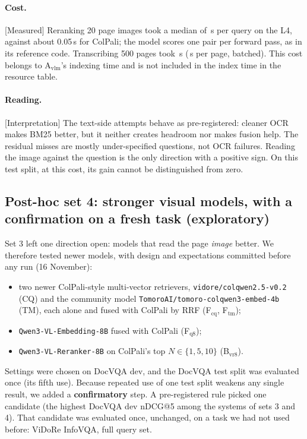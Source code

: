 \documentclass[11pt,a4paper]{article}
\newcommand{\lbl}[2]{\textsf{\scriptsize\textcolor{#1}{[#2]}}}
\newcommand{\Int}{\lbl{tagI}{Interpretation}}
\newcommand{\Mea}{\lbl{tagM}{Measured}}
\begin{document}
\paragraph{Cost.} \Mea{} Reranking 20 page images took a median of \vrLatTwenty{}\,s per query on the L4, against about 0.05\,s for ColPali; the model scores one pair per forward pass, as in its reference code. Transcribing 500 pages took \ocrS{}\,s (\ocrPerPage{}\,s per page, batched). This cost belongs to A$_\text{vlm}$'s indexing time and is not included in the index time in the resource table.

\paragraph{Reading.} \Int{} The text-side attempts behave as pre-registered: cleaner OCR makes BM25 better, but it neither creates headroom nor makes fusion help. The residual misses are mostly under-specified questions, not OCR failures. Reading the image against the question is the only direction with a positive sign. On this test split, at this cost, its gain cannot be distinguished from zero.

\subsection{Post-hoc set 4: stronger visual models, with a confirmation on a fresh task (exploratory)}
\label{sec:posthoc4}
Set 3 left one direction open: models that read the page \emph{image} better. We therefore tested newer models, with design and expectations committed before any run (16 November):
\begin{itemize}
  \item two newer ColPali-style multi-vector retrievers, \texttt{vidore/colqwen2.5-v0.2} (CQ) and the community model \texttt{TomoroAI/tomoro-colqwen3-embed-4b} (TM), each alone and fused with ColPali by RRF (F$_\text{cq}$, F$_\text{tm}$);
  \item \texttt{Qwen3-VL-Embedding-8B} fused with ColPali (F$_\text{q8}$);
  \item \texttt{Qwen3-VL-Reranker-8B} on ColPali's top $N \in \{1, 5, 10\}$ (B$_\text{vr8}$).
\end{itemize}
Settings were chosen on DocVQA dev, and the DocVQA test split was evaluated once (its fifth use).
Because repeated use of one test split weakens any single result, we added a \textbf{confirmatory} step. A pre-registered rule picked one candidate (the highest DocVQA dev nDCG@5 among the systems of sets 3 and 4). That candidate was evaluated once, unchanged, on a task we had not used before: ViDoRe InfoVQA, full query set.
\end{document}
